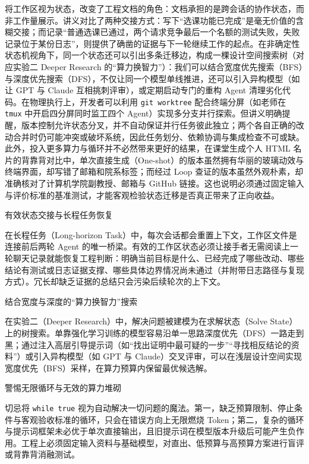 \documentclass[UTF8,a4paper,11pt,fontset=fandol]{ctexart}
\begin{document}
将工作区视为状态，改变了工程文档的角色：文档承担的是跨会话的协作状态，而非工作量展示。讲义对比了两种交接方式：写下“选课功能已完成”是毫无价值的含糊交接；而记录“普通选课已通过，两个请求竞争最后一个名额的测试失败，失败记录位于某份日志”，则提供了确凿的证据与下一轮继续工作的起点。在非确定性状态机视角下，同一个状态还可以引出多条迁移边，构成一棵设计空间搜索树（对应实验二 Deeper Research 的“算力换智力”）：我们可以结合宽度优先搜索（BFS）与深度优先搜索（DFS），不仅让同一个模型单线推进，还可以引入异构模型（如让 GPT 与 Claude 互相挑刺评审），或定期启动专门的重构 Agent 清理劣化代码。在物理执行上，开发者可以利用 \texttt{git worktree} 配合终端分屏（如老师在 \texttt{tmux} 中开启四分屏同时监工四个 Agent）实现多分支并行探索。但讲义明确提醒，版本控制允许状态分叉，并不自动保证并行任务彼此独立；两个各自正确的改动合并时仍可能冲突或破坏系统，因此任务划分、依赖协调与集成检查不可或缺。此外，投入更多算力与循环并不必然带来更好的结果，在课堂生成个人 HTML 名片的背靠背对比中，单次直接生成（One-shot）的版本虽然拥有华丽的玻璃动效与终端界面，却写错了邮箱和院系标签；而经过 Loop 查证的版本虽然外观朴素，却准确核对了计算机学院副教授、邮箱与 GitHub 链接。这也说明必须通过固定输入与评价标准的基准测试，才能客观检验状态迁移是否真正带来了正向收益。

\begin{importantbox}{有效状态交接与长程任务恢复}

在长程任务（Long-horizon Task）中，每次会话都会重置上下文，工作区文件是连接前后两轮 Agent 的唯一桥梁。有效的工作区状态必须让接手者无需阅读上一轮聊天记录就能恢复工程判断：明确当前目标是什么、已经完成了哪些改动、哪些结论有测试或日志证据支撑、哪些具体边界情况尚未通过（并附带日志路径与复现方式）。冗长却缺乏证据的总结只会污染后续轮次的上下文。

\end{importantbox}

\begin{knowledgebox}{结合宽度与深度的“算力换智力”搜索}

在实验二（Deeper Research）中，解决问题被建模为在求解状态（Solve State）上的树搜索。单靠强化学习训练的模型容易沿单一思路深度优先（DFS）一路走到黑；通过注入高层引导提示词（如“找出证明中最可疑的一步”“寻找相反结论的资料”）或引入异构模型（如 GPT 与 Claude）交叉评审，可以在浅层设计空间实现宽度优先（BFS）采样，在算力预算内保留最优候选解。

\end{knowledgebox}

\begin{warningbox}{警惕无限循环与无效的算力堆砌}

切忌将 \texttt{while true} 视为自动解决一切问题的魔法。第一，缺乏预算限制、停止条件与客观验收标准的循环，只会在错误方向上无限燃烧 Token；第二，复杂的循环与提示词框架未必优于单次直接输出，且旧提示词在模型版本升级后可能产生负作用。工程上必须固定输入资料与基础模型，对直出、低预算与高预算方案进行盲评或背靠背消融测试。

\end{warningbox}
\end{document}
